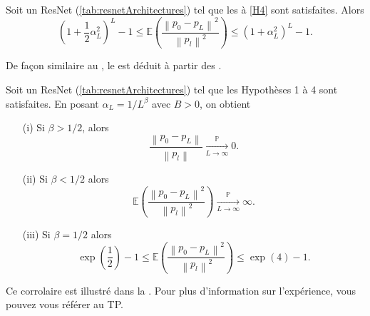 \begin{proposition}\label{prop7}
    Soit un ResNet (\ref{tab:resnetArchitectures}) tel que les  à \ref{H4} sont satisfaites. Alors 
    \[
        (1 + \frac{1}{2} \alpha _L ^2)^L - 1 \leqslant \mathbb{E}\left( \frac{\left\| p_0 - p_L \right\| ^2 }{\left\| p_l \right\| ^2 } \right) \leqslant (1 + \alpha _L ^2)^L - 1
    .\]
\end{proposition}

De façon similaire au , le  est déduit à partir des .

\begin{cor}\label{cor8}
    Soit un ResNet (\ref{tab:resnetArchitectures}) tel que les Hypothèses 1 à 4 sont satisfaites. En posant $ \alpha _L = 1 / L^\beta $ avec $ B > 0 $, on obtient 
    \begin{enumerate}
        \item [(i)] Si $ \beta > 1/2 $, alors 
        \[
            \frac{\left\| p_0 - p_L \right\| }{\left\| p_l \right\|  } \xrightarrow[L \to \infty]{\mathbb{P}} 0
        .\]
        \item [(ii)] Si $ \beta < 1/2 $ alors 
        \[
            \mathbb{E}\left(\frac{\left\| p_0 - p_L \right\| ^2 }{\left\| p_l \right\| ^2 }\right) \xrightarrow[L \to \infty]{\mathbb{P}} \infty
        .\]
        \item [(iii)] Si $ \beta = 1/2 $ alors
        \[
            \exp \left(\frac{1}{2}\right) - 1 \leqslant \mathbb{E}\left(\frac{\left\| p_0 - p_L \right\| ^2 }{\left\| p_l \right\| ^2 }\right) \leqslant \exp (4) - 1
        .\]
    \end{enumerate}
\end{cor}
Ce corrolaire est illustré dans la . Pour plus d'information sur l'expérience, vous pouvez vous référer au TP.


